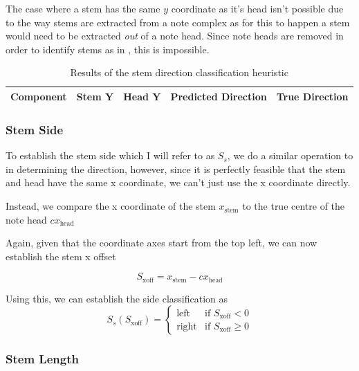 The case where a stem has the same $y$ coordinate as it's head isn't possible due to the way stems are extracted from a note complex as for this to happen a stem would need to be extracted \emph{out} of a note head. Since note heads are removed in order to identify stems as in , this is impossible.

\begin{table}[h]

    \begin{tabularx}{\textwidth}{ X l l l l }
    \toprule
    Component & Stem Y   & Head Y   & Predicted Direction & True Direction \\
    \midrule
    \bottomrule
    \end{tabularx}

    \label{table:stem-direction-results}
    \caption{Results of the stem direction classification heuristic}
\end{table}



\subsubsection{Stem Side}
To establish the stem side which I will refer to as $S_s$, we do a similar operation to in determining the direction, however, since it is perfectly feasible that the stem and head have the same x coordinate, we can't just use the x coordinate directly.

Instead, we compare the x coordinate of the stem $x_{\text{stem}}$ to the true centre  of the note head $cx_{\text{head}}$

Again, given that the coordinate axes start from the top left, we can now establish the stem x offset

$$
S_\text{xoff} = x_{\text{stem}} - cx_{\text{head}}
$$

Using this, we can establish the side classification as
$$
S_{s} (S_\text{xoff}) =
\left\{
	\begin{array}{ll}
		\text{left}   & \mbox{if } S_\text{xoff} < 0 \\
		\text{right}  & \mbox{if } S_\text{xoff} \ge 0
	\end{array}
\right.
$$

\subsubsection{Stem Length}

